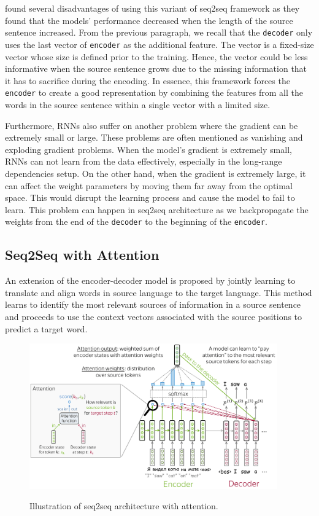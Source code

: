 \cite{cho2014properties} found several disadvantages of using this variant of seq2seq framework as they found that the models' performance decreased when the length of the source sentence increased.
From the previous paragraph, we recall that the \texttt{decoder} only uses the last vector of \texttt{encoder} as the additional feature.
The vector is a fixed-size vector whose size is defined prior to the training. Hence, the vector could be less informative when the source sentence grows due to the missing information that it has to sacrifice during the encoding. In essence, this framework forces the \texttt{encoder} to create a good representation by combining the features from all the words in the source sentence within a single vector with a limited size.


Furthermore, RNNs also suffer on another problem where the gradient can be extremely small or large. These problems are often mentioned as vanishing and exploding gradient problems. When the model's gradient is extremely small, RNNs can not learn from the data effectively, especially in the long-range dependencies setup. On the other hand, when the gradient is extremely large, it can affect the weight parameters by moving them far away from the optimal space. This would disrupt the learning process and cause the model to fail to learn. This problem can happen in seq2seq architecture as we backpropagate the weights from the end of the \texttt{decoder} to the beginning of the \texttt{encoder}.

\subsection{Seq2Seq with Attention}
An extension of the encoder-decoder model is proposed by jointly learning to translate and align words in source language to the target language\cite{bahdanau2015nmt}. This method learns to identify the most relevant sources of information in a source sentence and proceeds to use the context vectors associated with the source positions to predict a target word.

\begin{figure}[h]
    {\includegraphics[width=0.95\textwidth]{img/attseq2seq.png}}
    \centering
    \caption{Illustration of seq2seq architecture with attention\protect\footnotemark[2].}
    \label{img:attseq2seq}
\end{figure}

